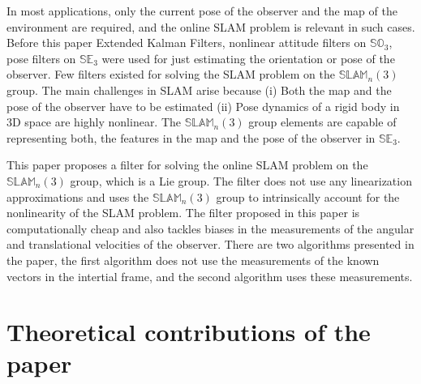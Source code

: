 \documentclass[12pt]{article}
\begin{document}
In most applications, only the current pose of the observer and the map of the environment are required, and the online SLAM problem is relevant in such cases.
Before this paper Extended Kalman Filters, nonlinear attitude filters on $\mathbb{SO}_3$,
 pose filters on $\mathbb{SE}_3$ were used for just estimating the orientation or pose of the observer. 
Few filters existed for solving the SLAM problem on the $\mathbb{SLAM}_n(3)$ group.
The main challenges in SLAM arise because (i) Both the map and the pose of the observer have to 
be estimated (ii) Pose dynamics of a rigid body in 3D space are highly nonlinear. 
The $\mathbb{SLAM}_n(3)$ group elements are capable of representing both, the features in 
the map and the pose of the observer in $\mathbb{SE}_3$.

This paper proposes a filter for solving the online SLAM problem on the $\mathbb{SLAM}_n(3)$ group, which is a Lie group. The filter does not use 
any linearization approximations and uses the $\mathbb{SLAM}_n(3)$ group to intrinsically account for the nonlinearity of the SLAM problem.
 The filter proposed in this paper is computationally cheap and also tackles 
 biases in the measurements of the angular and translational velocities of the observer.
There are two algorithms presented in the paper, the first algorithm does not use the measurements of the known vectors in the intertial frame, and the second algorithm uses these measurements.
\section{Theoretical contributions of the paper}
\end{document}
